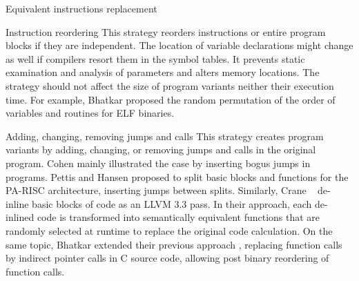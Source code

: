 \begin{strategy}{Equivalent instructions replacement}
\end{strategy}


\begin{strategy}{Instruction reordering}
    \label{strategy:S2}
    \normalfont
    This strategy reorders instructions or entire program blocks if they are independent.
    The location of variable declarations might change as well if compilers resort them in the symbol tables. It prevents static examination and analysis of parameters and alters memory locations. The strategy should not affect the size of program variants neither their execution time. For example, Bhatkar \etal \cite{bhatkar03, bhatkar2005efficient} proposed the random permutation of the order of variables and routines for ELF binaries.
\end{strategy}

\begin{strategy}{Adding, changing, removing jumps and calls}
    \label{strategy:S5}
    \normalfont
    This strategy creates program variants by adding, changing, or removing jumps and calls in the original program. Cohen \cite{cohen1993operating} mainly illustrated the case by inserting bogus jumps in programs. Pettis and Hansen \cite{pettisochhansen} proposed to split basic blocks and functions for the PA-RISC architecture, inserting jumps between splits.
    Similarly, Crane \etal~\cite{crane2015thwarting} de-inline basic blocks of code as an LLVM 3.3 pass. In their approach, each de-inlined code is transformed into semantically equivalent functions that are randomly selected at runtime to replace the original code calculation. On the same topic, Bhatkar \etal \cite{bhatkar2005efficient} extended their previous approach \cite{bhatkar03}, replacing function calls by indirect pointer calls in C source code, allowing post binary reordering of function calls.
\end{strategy}


